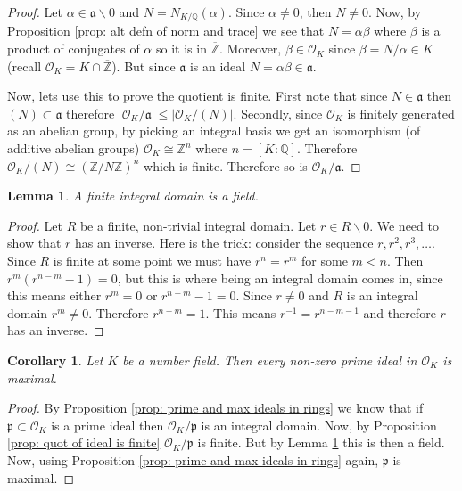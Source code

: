 \documentclass[11pt,a4paper]{report}
\theoremstyle{plain}
\newtheorem{lem}[subsection]{Lemma}
\newtheorem{cor}[subsection]{Corollary}
\theoremstyle{definition}
\theoremstyle{definition}
\newcommand{\ZZ}{\mathbb{Z}}
\def\QQ{\mathbb{Q}}
\def \Nm {N_{K/\QQ}}
\def\gothp{\mathfrak{p}}
\def \a{\alpha}
\def \OO {\mathcal{O}}
\def \ov{\overline}
\def\gotha{\mathfrak{a}}
\begin{document}
	\begin{proof}
		Let $\a \in \gotha \backslash 0$ and $N=\Nm(\a)$. Since $\a \neq 0$, then $N \neq 0$. Now, by Proposition \ref{prop: alt defn of norm and trace} we see that $N=\a \beta$ where $\beta$ is a product of conjugates of $\a$ so it is in $\ov{\ZZ}$. Moreover, $\beta \in \OO_K$ since $\beta=N/\a \in K$ (recall $\OO_K=K \cap \ov{\ZZ}$). But since $\gotha$ is an ideal $N=\a \beta \in \gotha$.
		
		Now, lets use this to prove the quotient is finite. First note that since $N \in \gotha$ then $(N) \subset \gotha$ therefore $|\OO_K /\gotha| \leq |\OO_K / (N)|$. Secondly, since $\OO_K$ is finitely generated as an abelian group, by picking an integral basis we get an isomorphism (of additive abelian groups) $\OO_K \cong \ZZ^n$ where $n=[K:\QQ]$. Therefore $\OO_K/(N) \cong (\ZZ/N\ZZ)^n$ which is finite. Therefore so is $\OO_K/\gotha$.
	\end{proof}
	
	
	
	\begin{lem}\label{lem: fin int dom is field}
		A finite integral domain is a field.
	\end{lem}
	
	
	\begin{proof}
		Let $R$ be a finite, non-trivial integral domain. Let $r \in R\backslash 0$. We need to show that $r$ has an inverse. Here is the trick: consider the sequence $r,r^2,r^3,\dots.$ Since $R$ is finite at some point we must have $r^n=r^m$ for some $m<n$. Then $r^m(r^{n-m}-1)=0$, but this is where being an integral domain comes in, since this means either $r^m=0$ or $r^{n-m}-1=0$. Since $r \neq 0$ and $R$ is an integral domain $r^m \neq 0$. Therefore $r^{n-m}=1$. This means $r^{-1}=r^{n-m-1}$ and therefore $r$ has an inverse.
	\end{proof}
	
	\begin{cor}\label{cor: prim ideal is maximal}
		Let $K$ be a number field. Then every non-zero prime ideal in $\OO_K$ is maximal.
	\end{cor}
	
	\begin{proof}
		By Proposition \ref{prop: prime and max ideals in rings} we know that if $\gothp \subset \OO_K$ is a prime ideal then $\OO_K/\gothp$ is an integral domain. Now, by Proposition \ref{prop: quot of ideal is finite} $\OO_K /\gothp$ is finite. But by Lemma \ref{lem: fin int dom is field} this is then a field. Now, using Proposition \ref{prop: prime and max ideals in rings} again, $\gothp$ is maximal.
	\end{proof}
	
\end{document}
